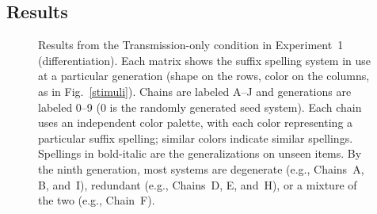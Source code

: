 \documentclass[doc,biblatex]{apa7}
\begin{document}
\subsection{Results}

	\begin{figure}
	\vspace*{2pt}
	\caption{Results from the Transmission-only condition in Experiment~1 (differentiation). Each matrix shows the suffix spelling system in use at a particular generation (shape on the rows, color on the columns, as in Fig.~\ref{stimuli}). Chains are labeled A--J and generations are labeled 0–9 (0 is the randomly generated seed system). Each chain uses an independent color palette, with each color representing a particular suffix spelling; similar colors indicate similar spellings. Spellings in bold-italic are the generalizations on unseen items. By the ninth generation, most systems are degenerate (e.g., Chains~A, B, and~I), redundant (e.g., Chains~D, E, and~H), or a mixture of the two (e.g., Chain~F).}
	\label{dif_lrn}
	\end{figure}
\end{document}
